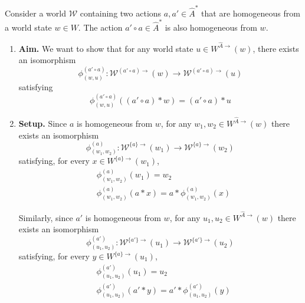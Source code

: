 \begin{propositionE}
    Consider a world $\mathscr{W}$ containing two actions $a, a' \in \hat{A}^{*}$ that are homogeneous from a world state $w \in W$.
    The action $a' \circ a \in \hat{A}^{*}$ is also homogeneous from $w$.
\end{propositionE}
\begin{proofE}
\begin{enumerate}[(1)]
    \item \textbf{Aim.}
    We want to show that for any world state $u \in W^{\hat{A}\to}(w)$, there exists an isomorphism
    \begin{equation}
        \phi^{(a' \circ a)}_{(w,u)} : \mathscr{W}^{(a' \circ a)\to}(w) \to \mathscr{W}^{(a' \circ a)\to}(u)
    \end{equation}
    satisfying
    \begin{equation}
        \phi^{(a' \circ a)}_{(w,u)} ( (a' \circ a) \ast w) = (a' \circ a) \ast u
    \end{equation}

    \item \textbf{Setup.}
    Since $a$ is homogeneous from $w$, for any $w_{1}, w_{2} \in W^{\hat{A}\to}(w)$ there exists an isomorphism
    \begin{equation}
        \phi_{(w_{1}, w_{2})}^{(a)}: \mathscr{W}^{\{a\}\to}(w_{1}) \to \mathscr{W}^{\{a\}\to}(w_{2})
    \end{equation}
    satisfying, for every $x \in W^{\{a\}\to}(w_{1})$,
    \begin{align}
        & \phi_{(w_{1}, w_{2})}^{(a)}(w_{1}) = w_{2} \\
        & \phi_{(w_{1}, w_{2})}^{(a)}(a \ast x) = a \ast \phi_{(w_{1}, w_{2})}^{(a)}(x)
    \end{align}

    Similarly, since $a'$ is homogeneous from $w$, for any $u_{1}, u_{2} \in W^{\hat{A}\to}(w)$ there exists an isomorphism
    \begin{equation}
        \phi_{(u_{1}, u_{2})}^{(a')}: \mathscr{W}^{\{a'\}\to}(u_{1}) \to \mathscr{W}^{\{a'\}\to}(u_{2})
    \end{equation}
    satisfying, for every $y \in W^{\{a\}\to}(u_{1})$,
    \begin{align}
        & \phi_{(u_{1}, u_{2})}^{(a')}(u_{1}) = u_{2} \\
        & \phi_{(u_{1}, u_{2})}^{(a')}(a' \ast y) = a' \ast \phi_{(u_{1}, u_{2})}^{(a')}(y)
    \end{align}


\end{enumerate}
\end{proofE}
